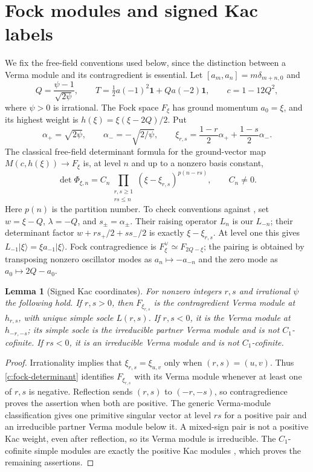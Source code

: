 \documentclass[11pt,a4paper]{article}
\numberwithin{equation}{section}
\newtheorem{lemma}[theorem]{Lemma}
\theoremstyle{definition}\newtheorem{definition}[theorem]{Definition}
\theoremstyle{remark}\newtheorem{remark}[theorem]{Remark}
\newcommand{\one}{\mathbf1}\newcommand{\B}{\mathcal B}\newcommand{\W}{W_N}
\begin{document}
\section{Fock modules and signed Kac labels}\label{c:fock-orientation}
We fix the free-field conventions used below, since the distinction
between a Verma module and its contragredient is essential.
Let $[a_m,a_n]=m\delta_{m+n,0}$ and
\[
 Q=\frac{\psi-1}{\sqrt{2\psi}},\qquad
 T=\tfrac12 a(-1)^2\one+Q a(-2)\one,
 \qquad c=1-12Q^2,
\]
where $\psi>0$ is irrational.  The Fock space $F_\xi$ has ground
momentum $a_0=\xi$, and its highest weight is
$h(\xi)=\xi(\xi-2Q)/2$.
Put
\[
 \alpha_+=\sqrt{2\psi},\qquad \alpha_-=-\sqrt{2/\psi},\qquad
 \xi_{r,s}=\frac{1-r}{2}\alpha_++\frac{1-s}{2}\alpha_-.
\]
The classical free-field determinant formula \cite[Proposition 2.7]{c:TK}
for the ground-vector map $M(c,h(\xi))\longrightarrow F_\xi$ is,
at level $n$ and up to a nonzero basis constant,
\begin{equation}\label{c:fock-determinant}
 \det\Phi_{\xi,n}
 =C_n\prod_{\substack{r,s\ge1\\rs\le n}}
          (\xi-\xi_{r,s})^{p(n-rs)},\qquad C_n\ne0.
\end{equation}
Here $p(n)$ is the partition number. To check conventions against
\cite{c:TK}, set $w=\xi-Q$, $\lambda=-Q$, and
$s_\pm=\alpha_\pm$. Their raising operator $L_n$ is our $L_{-n}$;
their determinant factor
$w+rs_+/2+ss_-/2$ is exactly $\xi-\xi_{r,s}$.
At level one this gives
$L_{-1}|\xi\rangle=\xi a_{-1}|\xi\rangle$.
Fock contragredience is $F_\xi^\vee\simeq F_{2Q-\xi}$; the pairing
is obtained by transposing nonzero oscillator modes as
$a_n\mapsto-a_{-n}$ and the zero mode as $a_0\mapsto2Q-a_0$.

\begin{lemma}[Signed Kac coordinates]\label{c:signed-fock}
For nonzero integers $r,s$ and irrational $\psi$ the following hold.
If $r,s>0$, then $F_{\xi_{r,s}}$ is the contragredient Verma module
at $h_{r,s}$, with unique simple socle $L(r,s)$.
If $r,s<0$, it is the Verma module at $h_{-r,-s}$; its simple socle
is the irreducible partner Verma module and is not $C_1$-cofinite.
If $rs<0$, it is an irreducible Verma module and is not $C_1$-cofinite.
\end{lemma}
\begin{proof}
Irrationality implies that $\xi_{r,s}=\xi_{u,v}$ only when
$(r,s)=(u,v)$.  Thus \eqref{c:fock-determinant} identifies
$F_{\xi_{r,s}}$ with its Verma module whenever at least one of $r,s$
is negative.  Reflection sends $(r,s)$ to $(-r,-s)$, so
contragredience proves the assertion when both are positive.
The generic Verma-module classification gives one primitive singular
vector at level $rs$ for a positive pair and an irreducible partner
Verma module below it.  A mixed-sign pair is not a positive Kac
weight, even after reflection, so its Verma module is irreducible.
The $C_1$-cofinite simple modules are exactly the positive Kac
modules \cite[Theorems 2.2.4 and 3.1.4]{virasoro}, which proves the
remaining assertions.
\end{proof}
\end{document}
